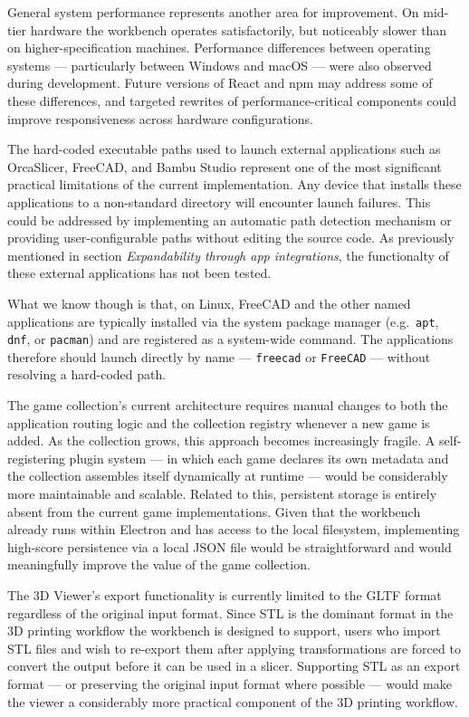\documentclass[a4paper,12pt]{article}
\begin{document}
General system performance represents another area for improvement. 
\newline On mid-tier hardware the workbench operates satisfactorily, but noticeably slower than on higher-specification machines. 
Performance differences between operating systems — particularly between Windows and macOS — were also observed during development. 
Future versions of React and npm may address some of these differences, and targeted rewrites of performance-critical components could improve responsiveness across hardware configurations.

The hard-coded executable paths used to launch external applications such as OrcaSlicer, FreeCAD, and Bambu Studio represent one of the most significant practical limitations of the current implementation. 
Any device that installs these applications to a non-standard directory will encounter launch failures. 
This could be addressed by implementing an automatic path detection mechanism or providing user-configurable paths without editing the source code.
As previously mentioned in section \textit{Expandability through app integrations}, the functionalty of these external applications has not been tested. 

\newpage
What we know though is that, on Linux, FreeCAD and the other named applications are typically installed via the system package manager 
(e.g.\ \texttt{apt}, \texttt{dnf}, or \texttt{pacman}) and are registered 
as a system-wide command. The applications therefore should launch directly 
by name — \texttt{freecad} or \texttt{FreeCAD} — without resolving a 
hard-coded path.

The game collection's current architecture requires manual changes to both the application routing logic and the collection registry whenever a new game is added. 
As the collection grows, this approach becomes increasingly fragile. 
A self-registering plugin system — in which each game declares its own metadata and the collection assembles itself dynamically at runtime — would be considerably more maintainable and scalable. 
Related to this, persistent storage is entirely absent from the current game implementations. 
Given that the workbench already runs within Electron and has access to the local filesystem, implementing high-score persistence via a local JSON file would be straightforward and would meaningfully improve the value of the game collection.

The 3D Viewer's export functionality is currently limited to the GLTF format regardless of the original input format. Since STL is the dominant format in the 3D printing workflow the workbench is designed to support, users who import STL files and wish to re-export them after applying transformations are forced to convert the output before it can be used in a slicer. Supporting STL as an export format — or preserving the original input format where possible — would make the viewer a considerably more practical component of the 3D printing workflow.
\end{document}
